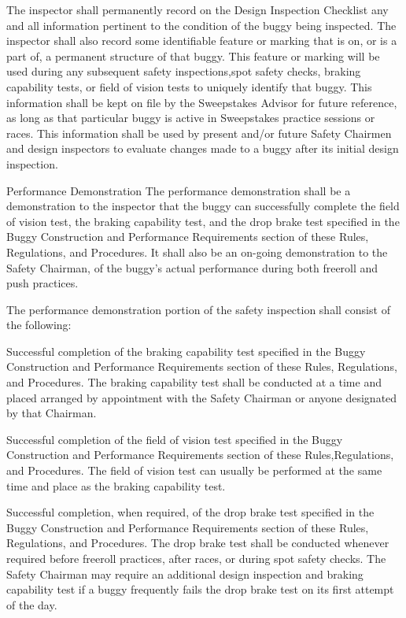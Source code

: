 \documentclass[openany]{book}
\begin{document}
The inspector shall permanently record on the Design Inspection Checklist any and all information pertinent to the condition of the buggy being inspected. The inspector shall also record some identifiable feature or marking that is on, or is a part of, a permanent structure of that buggy. This feature or marking will be used during any subsequent safety inspections,spot safety checks, braking capability tests, or field of vision tests to uniquely identify that buggy. This information shall be kept on file by the Sweepstakes Advisor for future reference, as long as that particular buggy is active in Sweepstakes practice sessions or races. This information shall be used by present and/or future Safety Chairmen and design inspectors to evaluate changes made to a buggy after its initial design inspection.

Performance Demonstration
The performance demonstration shall be a demonstration to the inspector that the buggy can successfully complete the field of vision test, the braking capability test, and the drop brake test specified in the Buggy Construction and Performance Requirements section of these Rules, Regulations, and Procedures. It shall also be an on-going demonstration to the Safety Chairman, of the buggy's actual performance during both freeroll and push practices.

The performance demonstration portion of the safety inspection shall consist of the following:

Successful completion of the braking capability test specified in the Buggy Construction and Performance Requirements section of these Rules, Regulations, and Procedures. The braking capability test shall be conducted at a time and placed arranged by appointment with the Safety Chairman or anyone designated by that Chairman.

Successful completion of the field of vision test specified in the Buggy Construction and Performance Requirements section of these Rules,Regulations, and Procedures. The field of vision test can usually be performed at the same time and place as the braking capability test.

Successful completion, when required, of the drop brake test specified in the Buggy Construction and Performance Requirements section of these Rules, Regulations, and Procedures. The drop brake test shall be conducted whenever required before freeroll practices, after races, or during spot safety checks. The Safety Chairman may require an additional design inspection and braking capability test if a buggy frequently fails the drop brake test on its first attempt of the day.
\end{document}
